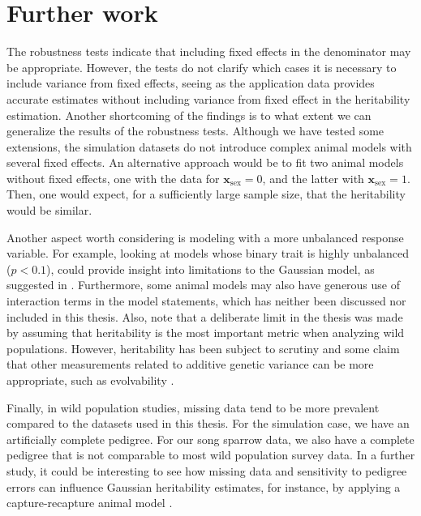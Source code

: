 \section{Further work}
The robustness tests indicate that including fixed effects in the denominator may be appropriate. However, the tests do not clarify which cases it is necessary to include variance from fixed effects, seeing as the application data provides accurate estimates without including variance from fixed effect in the heritability estimation. Another shortcoming of the findings is to what extent we can generalize the results of the robustness tests. Although we have tested some extensions, the simulation datasets do not introduce complex animal models with several fixed effects. An alternative approach would be to fit two animal models without fixed effects, one with the data for $\bm x_\text{sex}=0$, and the latter with $\bm x_\text{sex}=1$. Then, one would expect, for a sufficiently large sample size, that the heritability would be similar.

Another aspect worth considering is modeling with a more unbalanced response variable. For example, looking at models whose binary trait is highly unbalanced ($p < 0.1$), could provide insight into limitations to the Gaussian model, as suggested in \textcite{vanvleck1972}. Furthermore, some animal models may also have generous use of interaction terms in the model statements, which has neither been discussed nor included in this thesis.
Also, note that a deliberate limit in the thesis was made by assuming that heritability is the most important metric when analyzing wild populations. However, heritability has been subject to scrutiny and some claim that other measurements related to additive genetic variance can be more appropriate, such as evolvability \autocite{hansen2011}.

Finally, in wild population studies, missing data tend to be more prevalent compared to the datasets used in this thesis. For the simulation case, we have an artificially complete pedigree. For our song sparrow data, we also have a complete pedigree that is not comparable to most wild population survey data. In a further study, it could be interesting to see how missing data and sensitivity to pedigree errors can influence Gaussian heritability estimates, for instance, by applying a capture-recapture animal model \autocite{papaix2010combining}.